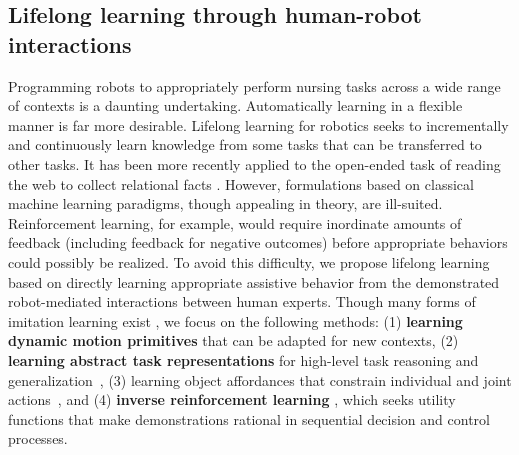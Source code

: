 \documentclass[letterpaper, 11 pt, onecolumn]{article}
\newcommand{\jie}[1]{\textcolor{green}{JF: #1}}
\begin{document}




\subsection{Lifelong learning through human-robot interactions}\label{sec:related-learning}



\noindent
Programming robots to appropriately perform nursing tasks across a wide range of contexts is a daunting undertaking.  
Automatically learning in a flexible manner is far more desirable.
Lifelong learning for robotics \cite{thrun1995lifelong,thrun1995lifelong2,thrun1998lifelong} seeks to incrementally and continuously learn knowledge from some tasks that can be transferred to other tasks. 
It has been more recently applied to the open-ended task of reading the web to collect relational facts \cite{banko2007strategies,carlson2010toward}. 
However, formulations based on classical machine learning paradigms, though appealing in theory, are ill-suited.
Reinforcement learning, for example, would require inordinate amounts of
feedback (including feedback for negative outcomes)
before appropriate behaviors could possibly be realized.
To avoid this difficulty, we propose lifelong learning based on directly learning appropriate assistive behavior from the demonstrated robot-mediated interactions between human experts.
Though many forms of imitation learning exist \cite{argall2009survey}, we focus on the following methods: (1) {\bf learning dynamic motion primitives} \cite{matsubara2011learning,kulic2012incremental} that can be adapted for new contexts, (2) \textbf{learning abstract task representations} for high-level task reasoning and generalization~\cite{niekum2013semantically,konidaris2012robot,konidaris2018skills}, (3) learning object affordances that constrain individual and joint actions~\cite{aksoy2011learning,knoblich2011psychological,shu2017learning}, and (4) {\bf inverse reinforcement learning} \cite{ng2000algorithms,abbeel2004apprenticeship}, which seeks utility functions that make demonstrations rational in sequential decision and control processes.
\end{document}
